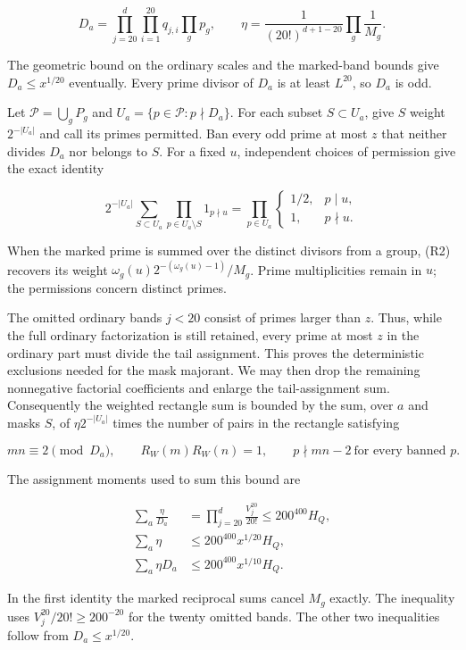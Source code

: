 \[
D_a=\prod_{j=20}^d\prod_{i=1}^{20}q_{j,i}\prod_gp_g,
\qquad
\eta=\frac1{(20!)^{d+1-20}}\prod_g\frac1{M_g}.
\]

The geometric bound on the ordinary scales and the marked-band bounds
give \(D_a\le x^{1/20}\) eventually. Every prime divisor of \(D_a\) is
at least \(L^{20}\), so \(D_a\) is odd.

Let \(\mathcal P=\bigcup_gP_g\) and
\(U_a=\{p\in\mathcal P:p\nmid D_a\}\). For each subset \(S\subset U_a\),
give \(S\) weight \(2^{-|U_a|}\) and call its primes permitted. Ban
every odd prime at most \(z\) that neither divides \(D_a\) nor belongs
to \(S\). For a fixed \(u\), independent choices of permission give the
exact identity

\[
2^{-|U_a|}\sum_{S\subset U_a}
 \prod_{p\in U_a\setminus S}1_{p\nmid u}
=\prod_{p\in U_a}
 \begin{cases}1/2,&p\mid u,\\1,&p\nmid u.\end{cases} \tag{R2}
\]

When the marked prime is summed over the distinct divisors from a group,
(R2) recovers its weight \(\omega_g(u)2^{-(\omega_g(u)-1)}/M_g\). Prime
multiplicities remain in \(u\); the permissions concern distinct primes.

The omitted ordinary bands \(j<20\) consist of primes larger than \(z\).
Thus, while the full ordinary factorization is still retained, every
prime at most \(z\) in the ordinary part must divide the tail
assignment. This proves the deterministic exclusions needed for the mask
majorant. We may then drop the remaining nonnegative factorial
coefficients and enlarge the tail-assignment sum. Consequently the
weighted rectangle sum is bounded by the sum, over \(a\) and masks
\(S\), of \(\eta2^{-|U_a|}\) times the number of pairs in the rectangle
satisfying

\[
mn\equiv2\pmod{D_a},\qquad R_W(m)R_W(n)=1,
\qquad p\nmid mn-2\ \text{for every banned }p. \tag{R3}
\]

The assignment moments used to sum this bound are

\[
\begin{aligned}
\sum_a\frac\eta{D_a}
 &=\prod_{j=20}^d\frac{V_j^{20}}{20!}
 \le200^{400}H_Q,\\
\sum_a\eta&\le200^{400}x^{1/20}H_Q,\\
\sum_a\eta D_a&\le200^{400}x^{1/10}H_Q.
\end{aligned} \tag{R4}
\]

In the first identity the marked reciprocal sums cancel \(M_g\) exactly.
The inequality uses \(V_j^{20}/20!\ge200^{-20}\) for the twenty omitted
bands. The other two inequalities follow from \(D_a\le x^{1/20}\).

